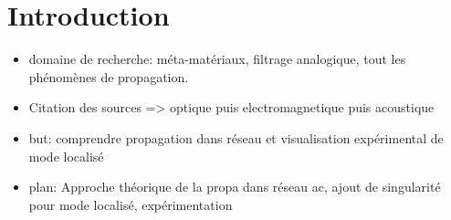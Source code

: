 \chapter{Introduction}

\begin{itemize}

\item domaine de recherche: méta-matériaux, filtrage analogique, tout les phénomènes de propagation.
\item Citation des sources => optique puis electromagnetique puis acoustique
\item but: comprendre propagation dans réseau et visualisation expérimental de mode localisé
\item plan: Approche théorique de la propa dans réseau ac, ajout de singularité pour mode localisé, expérimentation
\end{itemize}